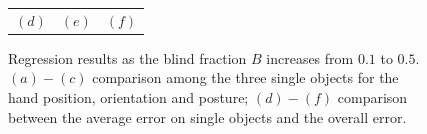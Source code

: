 \begin{figure}[htbp]
\begin{center}
\begin{tabular}{ccc}
      $(d)$ & $(e)$ & $(f)$ \\
    \end{tabular}
    \caption{Regression results as the blind fraction $B$ increases
    from $0.1$ to $0.5$. $(a)-(c)$ comparison among the three single
    objects for the hand position, orientation and posture; $(d)-(f)$
    comparison between the average error on single objects and the
    overall error.}
    \label{fig:err_all}
  \end{center}
\end{figure}
